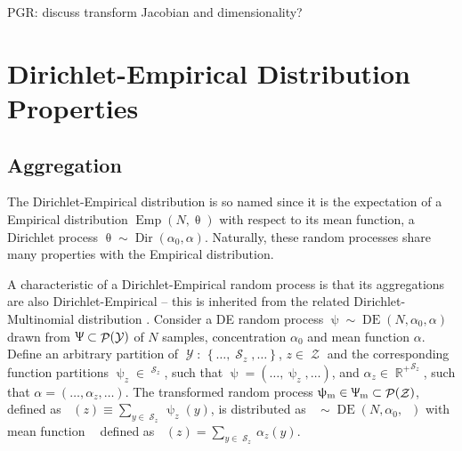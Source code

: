 \documentclass[12pt]{report}
\DeclareMathOperator{\Ycal}{\mathcal{Y}}
\DeclareMathOperator{\Zcal}{\mathcal{Z}}
\DeclareMathOperator{\Scal}{\mathcal{S}}
\DeclareMathOperator{\Pcal}{\mathcal{P}}
\DeclareMathOperator{\Rbb}{\mathbb{R}}
\DeclareMathOperator{\Rbbgeq}{\mathbb{R}_{\geq 0}}
\DeclareMathOperator{\Dir}{\mathrm{Dir}}
\DeclareMathOperator{\Emp}{\mathrm{Emp}}
\DeclareMathOperator{\DE}{\mathrm{DE}}
\DeclareMathOperator{\uppsim}{\uppsi_\text{m}}
\DeclareMathOperator{\Uppsim}{\Uppsi_\text{m}}
\DeclareMathOperator{\alpham}{\alpha_\text{m}}
\begin{document}
PGR: discuss transform Jacobian and dimensionality? 










\section{Dirichlet-Empirical Distribution Properties} 
\label{app:DE}

\subsection{Aggregation}

The Dirichlet-Empirical distribution is so named since it is the expectation of a Empirical distribution $\Emp(N,\uptheta)$ with respect to its mean function, a Dirichlet process $\uptheta \sim \Dir(\alpha_0, \alpha)$. Naturally, these random processes share many properties with the Empirical distribution.

A characteristic of a Dirichlet-Empirical random process is that its aggregations are also Dirichlet-Empirical -- this is inherited from the related Dirichlet-Multinomial distribution \cite{johnson}. Consider a DE random process $\uppsi \sim \DE(N,\alpha_0,\alpha)$ drawn from $\Uppsi \subset \Pcal(\Ycal)$ of $N$ samples, concentration $\alpha_0$ and mean function $\alpha$. Define an arbitrary partition of $\Ycal$: $\left\{ \ldots,\Scal_z,\ldots \right\}$, $z \in \Zcal$ and the corresponding function partitions $\uppsi_z \in \Rbbgeq^{\Scal_z}$, such that $\uppsi = \left( \ldots,\uppsi_z,\ldots \right)$, and $\alpha_z \in {\Rbb^+}^{\Scal_z}$, such that $\alpha = \left( \ldots,\alpha_z,\ldots \right)$. The transformed random process $\uppsim \in \Uppsim \subset \Pcal(\Zcal)$, defined as $\uppsim(z) \equiv \sum_{y \in \Scal_z} \uppsi_z(y)$, is distributed as $\uppsim \sim \DE(N,\alpha_0,\alpham)$ with mean function $\alpham$ defined as $\alpham(z) = \sum_{y \in \Scal_z} \alpha_z(y)$.
\end{document}
